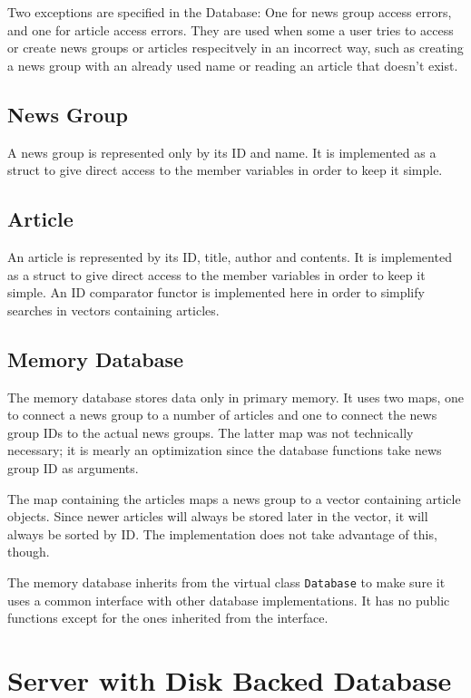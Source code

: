 \documentclass{acmsiggraph}               %
\begin{document}
Two exceptions are specified in the Database: One for news group access errors, and one for article
access errors. They are used when some a user tries to access or create news groups or articles respecitvely in an incorrect way, such as creating a news group with an already used name or reading an article that doesn't exist.

\subsection{News Group}
\label{ssec:ng}
A news group is represented only by its ID and name. It is implemented as a struct to give direct
access to the member variables in order to keep it simple. 

\subsection{Article}
\label{ssec:art}
An article is represented by its ID, title, author and contents. It is implemented as a struct to
give direct access to the member variables in order to keep it simple. An ID comparator functor
is implemented here in order to simplify searches in vectors containing articles.

\subsection{Memory Database}
\label{ssec:mem_db}
The memory database stores data only in primary memory. It uses two maps, one to connect a news group
to a number of articles and one to connect the news group IDs to the actual news groups. The latter
map was not technically necessary; it is mearly an optimization since the database functions take
news group ID as arguments. 

The map containing the articles maps a news group to a vector containing article objects. Since newer
articles will always be stored later in the vector, it will always be sorted by ID. The
implementation does not take advantage of this, though. 

The memory database inherits from the virtual class \texttt{Database} to make sure it uses a common 
interface with other database implementations. It has no public functions except for the ones inherited
from the interface.


\section{Server with Disk Backed Database}
\label{sec:sdiskdb}
\end{document}
